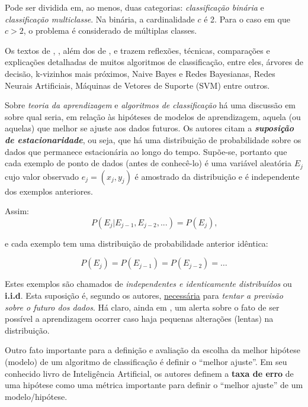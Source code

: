 Pode ser dividida em, ao menos, duas categorias: \textit{classificação binária} e \textit{classificação multiclasse}. Na binária, a cardinalidade $c$ é 2. Para o caso em que $c > 2$, o problema é considerado de múltiplas classes. \cite{Boscarioli2017} \cite{classification2013}

Os textos de \cite{classification2013}, \cite{performance_classification2013},  além dos de \cite{Wolpert:1996}, \cite{classification_survey2012} e \cite{using_data_mining2012}  trazem reflexões, técnicas, comparações e explicações detalhadas de muitos algoritmos de classificação, entre eles, árvores de decisão, k-vizinhos mais próximos, Naive Bayes e Redes Bayesianas, Redes Neurais Artificiais, Máquinas de Vetores de Suporte (SVM) entre outros.   

Sobre \textit{teoria da aprendizagem} e \textit{algoritmos de classificação} há uma discussão em \cite{Norvig2013} sobre qual seria, em relação às hipóteses de modelos de aprendizagem, aquela (ou aquelas) que melhor se ajuste aos dados futuros. Os autores citam a \textbf{\textit{suposição de estacionaridade}}, ou seja, que há uma distribuição de probabilidade sobre os dados que permanece estacionária ao longo do tempo. Supõe-se, portanto que cada exemplo de ponto de dados (antes de conhecê-lo) é uma variável aleatória $E_j$ cujo valor observado $e_j = (x_j, y_j)$ é amostrado da distribuição e é independente dos exemplos anteriores. 

Assim:
\begin{equation}
P(E_j|E_{j-1},E_{j-2}, ... ) = P(E_j)\text{,} 
\end{equation}

e cada exemplo tem uma distribuição de probabilidade anterior idêntica:

\begin{equation}
P(E_j) = P(E_{j-1}) = P(E_{j-2}) = \dots 
\end{equation}

Estes exemplos são chamados de \textit{independentes e identicamente distribuídos} ou \textbf{i.i.d}. Esta suposição é, segundo os autores, \underline{necessária} para \textit{tentar a previsão sobre o futuro dos dados}. Há claro, ainda em \cite{Norvig2013}, um alerta sobre o fato de ser possível a aprendizagem ocorrer caso haja pequenas alterações (lentas) na distribuição.

Outro fato importante para a definição e avaliação da escolha da melhor hipótese (modelo) de um algoritmo de classificação é definir o ``melhor ajuste''. Em seu conhecido livro de Inteligência Artificial, os autores \cite{Norvig2013} definem a \textbf{taxa de erro} de uma hipótese como uma métrica importante para definir o ``melhor ajuste'' de um modelo/hipótese.

